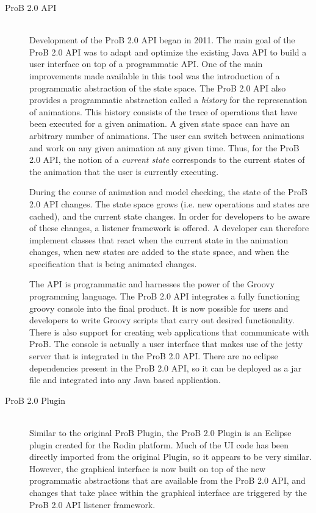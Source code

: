 \begin{description}
	\item[ProB 2.0 API] \hfill \\
	Development of the ProB 2.0 API began in 2011. The main goal of the ProB 2.0 API was to adapt and optimize the existing Java API to build a user interface on top of a programmatic API. One of the main improvements made available in this tool was the introduction of a programmatic abstraction of the state space. The ProB 2.0 API also provides a programmatic abstraction called a \emph{history} for the represenation of animations. This history consists of the trace of operations that have been executed for a given animation. A given state space can have an arbitrary number of animations. The user can switch between animations and work on any given animation at any given time. Thus, for the ProB 2.0 API, the notion of a \emph{current state} corresponds to the current states of the animation that the user is currently executing.

	During the course of animation and model checking, the state of the ProB 2.0 API changes. The state space grows (i.e. new operations and states are cached), and the current state changes. In order for developers to be aware of these changes, a listener framework is offered. A developer can therefore implement classes that react when the current state in the animation changes, when new states are added to the state space, and when the specification that is being animated changes.

	The API is programmatic and harnesses the power of the Groovy programming language. The ProB 2.0 API integrates a fully functioning groovy console into the final product. It is now possible for users and developers to write Groovy scripts that carry out desired functionality. There is also support for creating web applications that communicate with ProB. The console is actually a user interface that makes use of the jetty server that is integrated in the ProB 2.0 API. There are no eclipse dependencies present in the ProB 2.0 API, so it can be deployed as a jar file and integrated into any Java based application.

	\item[ProB 2.0 Plugin] \hfill \\
	Similar to the original ProB Plugin, the ProB 2.0 Plugin is an Eclipse plugin created for the Rodin platform. Much of the UI code has been directly imported from the original Plugin, so it appears to be very similar. However, the graphical interface is now built on top of the new programmatic abstractions that are available from the ProB 2.0 API, and changes that take place within the graphical interface are triggered by the ProB 2.0 API listener framework.

\end{description}

